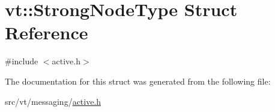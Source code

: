 \hypertarget{structvt_1_1_strong_node_type}{}\section{vt\+:\+:Strong\+Node\+Type Struct Reference}
\label{structvt_1_1_strong_node_type}


{\ttfamily \#include $<$active.\+h$>$}



The documentation for this struct was generated from the following file\+:\begin{DoxyCompactItemize}
\item 
src/vt/messaging/\hyperlink{active_8h}{active.\+h}\end{DoxyCompactItemize}
